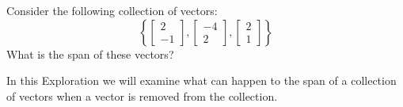 \documentclass{ximera}
\begin{document}
\begin{exploration}\label{exp:redundantVecs1}
Consider the following collection of vectors:
$$\left\{\begin{bmatrix}2\\-1\end{bmatrix}, \begin{bmatrix}-4\\2\end{bmatrix}, \begin{bmatrix}2\\1\end{bmatrix}\right\}$$
What is the span of these vectors?  

In this Exploration we will examine what can happen to the span of a collection of vectors when a vector is removed from the collection.  


\end{exploration}
\end{document}
